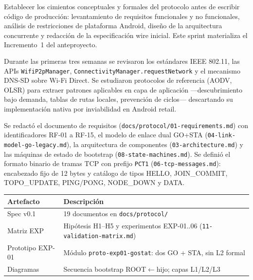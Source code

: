 

Establecer los cimientos conceptuales y formales del protocolo antes de escribir código de producción: levantamiento de requisitos funcionales y no funcionales, análisis de restricciones de plataforma Android, diseño de la arquitectura concurrente y redacción de la especificación wire inicial. Este sprint materializa el Incremento~1 del anteproyecto.


Durante las primeras tres semanas se revisaron los estándares IEEE 802.11, las APIs \texttt{WifiP2pManager}, \texttt{ConnectivityManager.requestNetwork} y el mecanismo DNS-SD sobre Wi-Fi Direct. Se estudiaron protocolos de referencia (AODV, OLSR) para extraer patrones aplicables en capa de aplicación —descubrimiento bajo demanda, tablas de rutas locales, prevención de ciclos— descartando su implementación nativa por inviabilidad en Android retail.

Se redactó el documento de requisitos (\texttt{docs/protocol/01-requirements.md}) con identificadores RF-01 a RF-15, el modelo de enlace dual GO+STA (\texttt{04-link-model-go-legacy.md}), la arquitectura de componentes (\texttt{03-architecture.md}) y las máquinas de estado de bootstrap (\texttt{08-state-machines.md}). Se definió el formato binario de tramas TCP con prefijo \texttt{PCT1} (\texttt{06-tcp-messages.md}): encabezado fijo de 12 bytes y catálogo de tipos HELLO, JOIN\_COMMIT, TOPO\_UPDATE, PING/PONG, NODE\_DOWN y DATA.


\begin{center}
\small
\begin{tabular}{@{}p{2.2cm}p{10.5cm}@{}}
\hline
\textbf{Artefacto} & \textbf{Descripción} \\
\hline
Spec v0.1 & 19 documentos en \texttt{docs/protocol/} \\
Matriz EXP & Hipótesis H1--H5 y experimentos EXP-01..06 (\texttt{11-validation-matrix.md}) \\
Prototipo EXP-01 & Módulo \texttt{proto-exp01-gostat}: dos GO + STA, sin L2 formal \\
Diagramas & Secuencia bootstrap ROOT$\leftarrow$hijo; capas L1/L2/L3 \\
\hline
\end{tabular}
\end{center}

